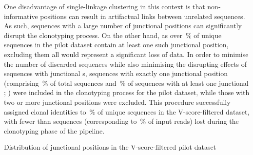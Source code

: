 One disadvantage of single-linkage clustering in this context is that non-informative  positions can result in artifactual links between unrelated sequences. As such, sequences with a large number of junctional  positions can significantly disrupt the clonotyping process. On the other hand, as over \,\% of unique sequences in the pilot dataset contain at least one such junctional  position, excluding them all would represent a significant loss of data. In order to minimise the number of discarded sequences while also minimising the disrupting effects of sequences with junctional s, sequences with exactly one junctional  position (comprising \,\% of total sequences and \,\% of sequences with at least one junctional ; ) were included in the clonotyping process for the pilot dataset, while those with two or more junctional  positions were excluded. This procedure successfully assigned clonal identities to \,\% of unique sequences in the V-score-filtered dataset, with fewer than  sequences (corresponding to \,\% of input reads) lost during the clonotyping phase of the pipeline.

\begin{table}
\caption{Distribution of junctional  positions in the V-score-filtered pilot dataset}
\label{tab:igseq-pilot-filtered-nn}

\end{table}

